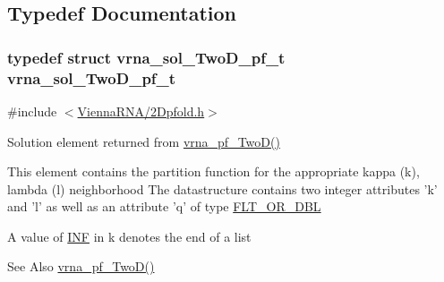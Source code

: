 \subsection{Typedef Documentation}
\hypertarget{group__kl__neighborhood__pf_ga5e449fbd695406aabd2bcabddc374621}{
\subsubsection[{vrna\-\_\-sol\-\_\-\-Two\-D\-\_\-pf\-\_\-t}]{\setlength{\rightskip}{0pt plus 5cm}typedef struct {\bf vrna\-\_\-sol\-\_\-\-Two\-D\-\_\-pf\-\_\-t}  {\bf vrna\-\_\-sol\-\_\-\-Two\-D\-\_\-pf\-\_\-t}}}\label{group__kl__neighborhood__pf_ga5e449fbd695406aabd2bcabddc374621}


{\ttfamily \#include $<$\hyperlink{2Dpfold_8h}{Vienna\-R\-N\-A/2\-Dpfold.\-h}$>$}



Solution element returned from \hyperlink{group__kl__neighborhood__pf_ga0bc3427689bd09da09b8b3094a27f836}{vrna\-\_\-pf\-\_\-\-Two\-D()} 

This element contains the partition function for the appropriate kappa (k), lambda (l) neighborhood The datastructure contains two integer attributes 'k' and 'l' as well as an attribute 'q' of type \hyperlink{group__data__structures_ga31125aeace516926bf7f251f759b6126}{F\-L\-T\-\_\-\-O\-R\-\_\-\-D\-B\-L}

A value of \hyperlink{energy__const_8h_a12c2040f25d8e3a7b9e1c2024c618cb6}{I\-N\-F} in k denotes the end of a list

\begin{DoxySeeAlso}{See Also}
\hyperlink{group__kl__neighborhood__pf_ga0bc3427689bd09da09b8b3094a27f836}{vrna\-\_\-pf\-\_\-\-Two\-D()} 
\end{DoxySeeAlso}


